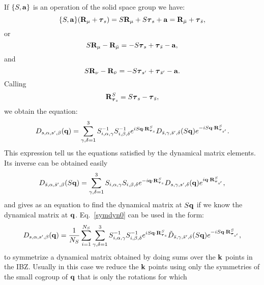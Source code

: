 \documentclass[12pt,a4paper,twoside]{report}
\begin{document}
If $\{S,{\bf a}\}$ is an operation of the solid space group we have:
\begin{equation}
\{S,{\bf a}\} ({\bf R}_\mu + \boldsymbol{\tau}_{s}) = 
S {\bf R}_\mu + S \boldsymbol{\tau}_{s} +{\bf a}=
{\bf R}_{\bar \mu} + \boldsymbol{\tau}_{\bar s},
\end{equation}
or
\begin{equation}
S {\bf R}_\mu -  {\bf R}_{\bar \mu} = - S \boldsymbol{\tau}_s + \boldsymbol{\tau}_{\bar s} - {\bf a},
\end{equation}
and
\begin{equation}
S {\bf R}_\nu -  {\bf R}_{\bar \nu} = - S \boldsymbol{\tau}_{s'} + \boldsymbol{\tau}_{\bar s'} - {\bf a}.
\end{equation}
Calling
\begin{equation}
{\bf R}^{S}_{\boldsymbol{\tau}_s} = S \boldsymbol{\tau}_{s} - \boldsymbol{\tau}_{\bar s},
\label{rstaus}
\end{equation}
we obtain the equation:
\begin{equation}
D_{s,\alpha,s',\beta}({\bf q}) =
\sum_{\gamma,\delta=1}^3  S^{-1}_{i,\alpha,\gamma} S^{-1}_{i,\beta,\delta}
e^{i S {\bf q} \cdot {\bf R}^{S}_{\boldsymbol{\tau}_s} }
D_{\bar s,\gamma,\bar s',\delta}(S{\bf q})
e^{-i S{\bf q} \cdot {\bf R}^{S}_{\boldsymbol{\tau}_{s'}}}.
\label{symdyn0}
\end{equation}
This expression tell us the equations satisfied by the dynamical matrix elements.
Its inverse can be obtained easily
\begin{equation}
D_{\bar s,\alpha,\bar s',\beta}(S{\bf q}) =
\sum_{\gamma,\delta=1}^3  S_{i,\alpha,\gamma} S_{i,\beta,\delta}
e^{-i {\bf q} \cdot {\bf R}^{S}_{\boldsymbol{\tau}_s} }
D_{s,\gamma,s',\delta}({\bf q})
e^{i {\bf q} \cdot {\bf R}^{S}_{\boldsymbol{\tau}_{s'}}},
\label{dynmat_inv}
\end{equation}
and gives as an equation to find the dynamical matrix at $S{\bf q}$ if we know the dynamical matrix at
${\bf q}$.
Eq.~\ref{symdyn0} can be used in the form:
\begin{equation}
D_{s,\alpha,s',\beta}({\bf q}) ={1\over N_S}
\sum_{i=1}^{N_S}
\sum_{\gamma,\delta=1}^3  S^{-1}_{i,\alpha,\gamma} S^{-1}_{i,\beta,\delta}
e^{i S {\bf q} \cdot {\bf R}^{S}_{\boldsymbol{\tau}_s} }
\tilde D_{\bar s,\gamma,\bar s',\delta}(S{\bf q})
e^{-i S{\bf q} \cdot {\bf R}^{S}_{\boldsymbol{\tau}_{s'}}},
\label{symdyn1}
\end{equation}
to symmetrize a dynamical matrix obtained by doing sums over the ${\bf k}$ points in the IBZ. Usually in this case we reduce the ${\bf k}$ points using only the symmetries of the small cogroup of ${\bf q}$ that is only the rotations for which
\end{document}
